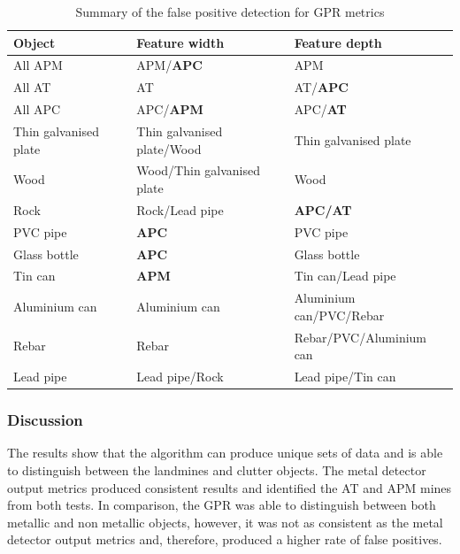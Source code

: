 \documentclass[main.tex]{subfiles}
\begin{document}
\begin{table}[!ht]
\centering
\caption{Summary of the false positive detection for GPR metrics}
\begin{tabular}{lll}
\toprule
Object & Feature width & Feature depth \\ \midrule
All APM & APM/\textbf{APC} & APM \\
All AT & AT & AT/\textbf{APC} \\
All APC & APC/\textbf{APM} & APC/\textbf{AT} \\
Thin galvanised plate & Thin galvanised plate/Wood & Thin galvanised plate \\
Wood & Wood/Thin galvanised plate & Wood \\
Rock & Rock/Lead pipe & \textbf{APC/AT} \\
PVC pipe & \textbf{APC} & PVC pipe \\
Glass bottle & \textbf{APC} & Glass bottle \\
Tin can & \textbf{APM} & Tin can/Lead pipe \\
Aluminium can & Aluminium can & Aluminium can/PVC/Rebar \\
Rebar & Rebar & Rebar/PVC/Aluminium can \\
Lead pipe & Lead pipe/Rock & Lead pipe/Tin can\\ \bottomrule
\end{tabular}
\end{table}

\subsubsection{Discussion}
The results show that the algorithm can produce unique sets of data and is able to distinguish between the landmines and clutter objects. The metal detector output metrics produced consistent results and identified the AT and APM mines from both tests. In comparison, the GPR was able to distinguish between both metallic and non metallic objects, however, it was not as consistent as the metal detector output metrics and, therefore, produced a higher rate of false positives.
\end{document}
